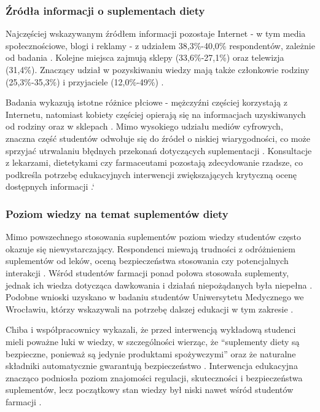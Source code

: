 \subsubsection{Źródła informacji o suplementach diety}

Najczęściej wskazywanym źródłem informacji pozostaje Internet - w tym media społecznościowe, blogi i reklamy - z udziałem 38,3\%-40,0\% respondentów, zależnie od badania \cite{kobayashi2017prevalence,chiba2020educational}. Kolejne miejsca zajmują sklepy (33,6\%-27,1\%) oraz telewizja (31,4\%). Znaczący udział w pozyskiwaniu wiedzy mają także członkowie rodziny (25,3\%-35,3\%) i przyjaciele (12,0\%-49\%) \cite{kobayashi2017prevalence,chiba2020educational,freeman2015dietary}.  

Badania wykazują istotne różnice płciowe - mężczyźni częściej korzystają z Internetu, natomiast kobiety częściej opierają się na informacjach uzyskiwanych od rodziny oraz w sklepach \cite{kobayashi2017prevalence,freeman2015dietary}. Mimo wysokiego udziału mediów cyfrowych, znaczna część studentów odwołuje się do źródeł o niskiej wiarygodności, co może sprzyjać utrwalaniu błędnych przekonań dotyczących suplementacji \cite{freeman2015dietary}. Konsultacje z lekarzami, dietetykami czy farmaceutami pozostają zdecydowanie rzadsze, co podkreśla potrzebę edukacyjnych interwencji zwiększających krytyczną ocenę dostępnych informacji \cite{croatia-knowledge-and-use,diet-lifestyle,chiba2020educational}.`

\subsubsection{Poziom wiedzy na temat suplementów diety}

Mimo powszechnego stosowania suplementów poziom wiedzy studentów często okazuje się niewystarczający. Respondenci miewają trudności z odróżnieniem suplementów od leków, oceną bezpieczeństwa stosowania czy potencjalnych interakcji \cite{knowledge-and-use,serbian-undergraduate}. Wśród studentów farmacji ponad połowa stosowała suplementy, jednak ich wiedza dotycząca dawkowania i działań niepożądanych była niepełna \cite{pharmacist-knowledge-and-use}. Podobne wnioski uzyskano w badaniu studentów Uniwersytetu Medycznego we Wrocławiu, którzy wskazywali na potrzebę dalszej edukacji w tym zakresie \cite{diet-lifestyle}.  

Chiba i współpracownicy wykazali, że przed interwencją wykładową studenci mieli poważne luki w wiedzy, w szczególności wierząc, że \enquote{suplementy diety są bezpieczne, ponieważ są jedynie produktami spożywczymi} oraz że naturalne składniki automatycznie gwarantują bezpieczeństwo \cite{chiba2020educational}. Interwencja edukacyjna znacząco podniosła poziom znajomości regulacji, skuteczności i bezpieczeństwa suplementów, lecz początkowy stan wiedzy był niski nawet wśród studentów farmacji \cite{chiba2020educational}.  

